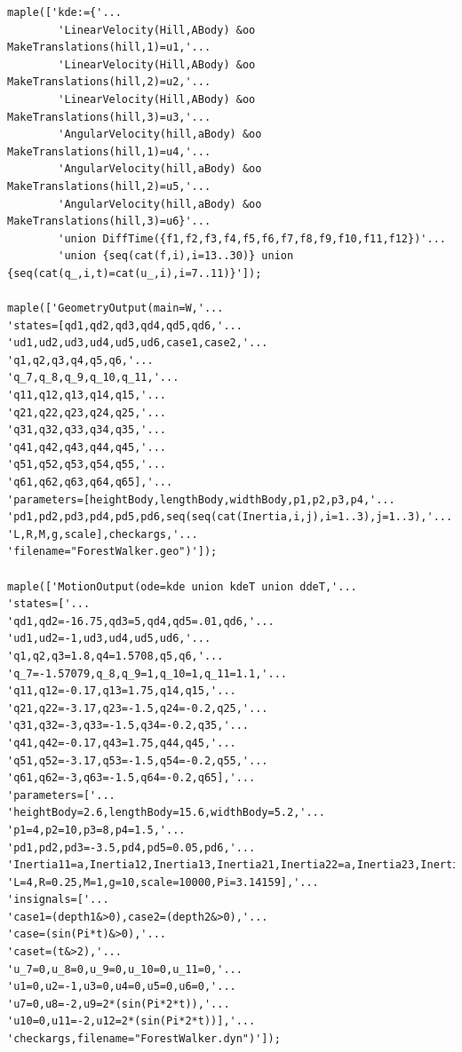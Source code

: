 \documentclass{article}
\begin{document}
\begin{verbatim}
maple(['kde:={'...
        'LinearVelocity(Hill,ABody) &oo MakeTranslations(hill,1)=u1,'...
        'LinearVelocity(Hill,ABody) &oo MakeTranslations(hill,2)=u2,'...
        'LinearVelocity(Hill,ABody) &oo MakeTranslations(hill,3)=u3,'...
        'AngularVelocity(hill,aBody) &oo MakeTranslations(hill,1)=u4,'...
        'AngularVelocity(hill,aBody) &oo MakeTranslations(hill,2)=u5,'...
        'AngularVelocity(hill,aBody) &oo MakeTranslations(hill,3)=u6}'...
        'union DiffTime({f1,f2,f3,f4,f5,f6,f7,f8,f9,f10,f11,f12})'...
        'union {seq(cat(f,i),i=13..30)} union {seq(cat(q_,i,t)=cat(u_,i),i=7..11)}']);

maple(['GeometryOutput(main=W,'...
'states=[qd1,qd2,qd3,qd4,qd5,qd6,'...
'ud1,ud2,ud3,ud4,ud5,ud6,case1,case2,'...
'q1,q2,q3,q4,q5,q6,'...
'q_7,q_8,q_9,q_10,q_11,'...
'q11,q12,q13,q14,q15,'...
'q21,q22,q23,q24,q25,'...
'q31,q32,q33,q34,q35,'...
'q41,q42,q43,q44,q45,'...
'q51,q52,q53,q54,q55,'...
'q61,q62,q63,q64,q65],'...
'parameters=[heightBody,lengthBody,widthBody,p1,p2,p3,p4,'...
'pd1,pd2,pd3,pd4,pd5,pd6,seq(seq(cat(Inertia,i,j),i=1..3),j=1..3),'...
'L,R,M,g,scale],checkargs,'...
'filename="ForestWalker.geo")']);

maple(['MotionOutput(ode=kde union kdeT union ddeT,'...
'states=['...
'qd1,qd2=-16.75,qd3=5,qd4,qd5=.01,qd6,'...
'ud1,ud2=-1,ud3,ud4,ud5,ud6,'...
'q1,q2,q3=1.8,q4=1.5708,q5,q6,'...
'q_7=-1.57079,q_8,q_9=1,q_10=1,q_11=1.1,'...
'q11,q12=-0.17,q13=1.75,q14,q15,'...
'q21,q22=-3.17,q23=-1.5,q24=-0.2,q25,'...
'q31,q32=-3,q33=-1.5,q34=-0.2,q35,'...
'q41,q42=-0.17,q43=1.75,q44,q45,'...
'q51,q52=-3.17,q53=-1.5,q54=-0.2,q55,'...
'q61,q62=-3,q63=-1.5,q64=-0.2,q65],'...
'parameters=['...
'heightBody=2.6,lengthBody=15.6,widthBody=5.2,'...
'p1=4,p2=10,p3=8,p4=1.5,'...
'pd1,pd2,pd3=-3.5,pd4,pd5=0.05,pd6,'...
'Inertia11=a,Inertia12,Inertia13,Inertia21,Inertia22=a,Inertia23,Inertia31,Inertia32,Inertia33=c,'...
'L=4,R=0.25,M=1,g=10,scale=10000,Pi=3.14159],'...
'insignals=['...
'case1=(depth1&>0),case2=(depth2&>0),'...
'case=(sin(Pi*t)&>0),'...
'caset=(t&>2),'...
'u_7=0,u_8=0,u_9=0,u_10=0,u_11=0,'...
'u1=0,u2=-1,u3=0,u4=0,u5=0,u6=0,'...
'u7=0,u8=-2,u9=2*(sin(Pi*2*t)),'...
'u10=0,u11=-2,u12=2*(sin(Pi*2*t))],'...
'checkargs,filename="ForestWalker.dyn")']);
\end{verbatim}
\end{document}
